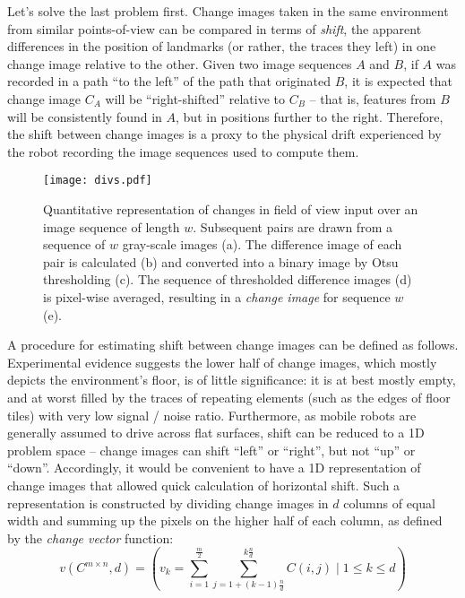 \documentclass[twocolumn, 9pt,fleqn]{jsproceedings}
\begin{document}
Let's solve the last problem first. Change images taken in the same environment from similar points-of-view can be compared in terms of \textit{shift}, the apparent differences in the position of landmarks (or rather, the traces they left) in one change image relative to the other. Given two image sequences $A$ and $B$, if $A$ was recorded in a path ``to the left'' of the path that originated $B$, it is expected that change image $C_A$ will be ``right-shifted'' relative to $C_B$ -- that is, features from $B$ will be consistently found in $A$, but in positions further to the right. Therefore, the shift between change images is a proxy to the physical drift experienced by the robot recording the image sequences used to compute them.

\begin{figure}[h!]
\texttt{[image: divs.pdf]}
\caption{Quantitative representation of changes in field of view input over an image sequence of length $w$. Subsequent pairs are drawn from a sequence of $w$ gray-scale images (a). The difference image of each pair is calculated (b) and converted into a binary image by Otsu thresholding (c). The sequence of thresholded difference images (d) is pixel-wise averaged, resulting in a \textit{change image} for sequence $w$ (e).}
\label{fig:divs}
\end{figure}

A procedure for estimating shift between change images can be defined as follows. Experimental evidence suggests the lower half of change images, which mostly depicts the environment's floor, is of little significance: it is at best mostly empty, and at worst filled by the traces of repeating elements (such as the edges of floor tiles) with very low signal / noise ratio. Furthermore, as mobile robots are generally assumed to drive across flat surfaces, shift can be reduced to a 1D problem space -- change images can shift ``left'' or ``right'', but not ``up'' or ``down''. Accordingly, it would be convenient to have a 1D representation of change images that allowed quick calculation of horizontal shift. Such a representation is constructed by dividing change images in $d$ columns of equal width and summing up the pixels on the higher half of each column, as defined by the \textit{change vector} function:
\begin{equation}
v(C^{m \times n}, d) = (v_k = \sum_{i=1}^{\frac{m}{2}} {\sum_{j=1 + (k - 1)\frac{n}{d}}^{k\frac{n}{d}}{C(i, j)}} \; | \; 1 \leq k \leq d)
\end{equation}
\end{document}
